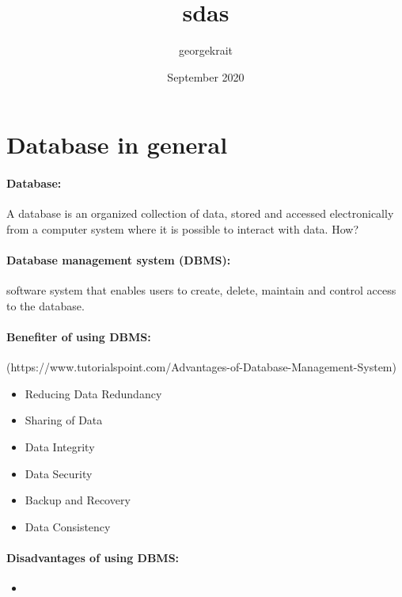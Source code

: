 \documentclass{article}
\title{sdas}
\author{georgekrait }
\date{September 2020}
\begin{document}
\maketitle


\section{Database in general}

\paragraph{Database:} A database is an organized collection of data,
stored and accessed electronically from a computer system where it is possible to interact with data. How?

 \paragraph{Database management system (DBMS):} software system that enables users to create, delete,
maintain and control access to the database.


\paragraph{Benefiter of using DBMS:}
(https://www.tutorialspoint.com/Advantages-of-Database-Management-System)


\begin{itemize}
\item Reducing Data Redundancy
\item  Sharing of Data
\item Data Integrity
\item Data Security
\item Backup and Recovery
\item Data Consistency


\end{itemize}



\paragraph{Disadvantages of using DBMS:}

\begin{itemize}

\item 
\end{itemize}
\end{document}
